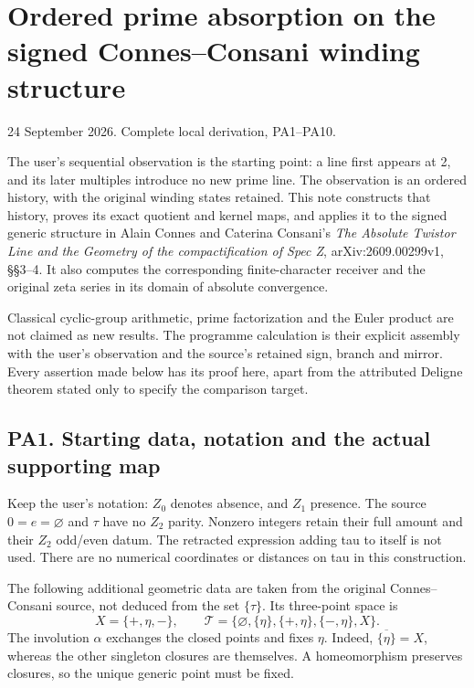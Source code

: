 \section{Ordered prime absorption on the signed Connes--Consani winding structure}\label{pa20260924-ordered-prime-absorption-on-the-signed-connesconsani-winding-structure}

24 September 2026. Complete local derivation, PA1--PA10.

The user's sequential observation is the starting point: a line first appears at 2, and its later multiples introduce no new prime line. The observation is an ordered history, with the original winding states retained. This note constructs that history, proves its exact quotient and kernel maps, and applies it to the signed generic structure in Alain Connes and Caterina Consani's \emph{The Absolute Twistor Line and the Geometry of the compactification of Spec Z}, arXiv:2609.00299v1, §§3--4. It also computes the corresponding finite-character receiver and the original zeta series in its domain of absolute convergence.

Classical cyclic-group arithmetic, prime factorization and the Euler product are not claimed as new results. The programme calculation is their explicit assembly with the user's observation and the source's retained sign, branch and mirror. Every assertion made below has its proof here, apart from the attributed Deligne theorem stated only to specify the comparison target.

\subsection{PA1. Starting data, notation and the actual supporting map}\label{pa20260924-pa1.-starting-data-notation-and-the-actual-supporting-map}

Keep the user's notation: \(Z_0\) denotes absence, and \(Z_1\) presence. The source \(0=e=\varnothing\) and \(\tau\) have no \(Z_2\) parity. Nonzero integers retain their full amount and their \(Z_2\) odd/even datum. The retracted expression adding tau to itself is not used. There are no numerical coordinates or distances on tau in this construction.

The following additional geometric data are taken from the original Connes--Consani source, not deduced from the set \(\{\tau\}\). Its three-point space is \[
X=\{+,\eta,-\},\qquad
\mathcal T=\{\varnothing,\{\eta\},\{+,\eta\},\{-,\eta\},X\}.
\] The involution \(\alpha\) exchanges the closed points and fixes \(\eta\). Indeed, \(\overline{\{\eta\}}=X\), whereas the other singleton closures are themselves. A homeomorphism preserves closures, so the unique generic point must be fixed.

